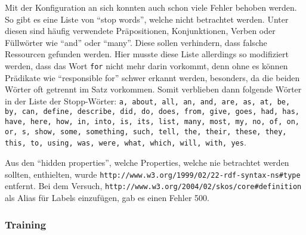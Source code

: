 Mit der Konfiguration an sich konnten auch schon viele Fehler behoben werden.
So gibt es eine Liste von \enquote{stop words}, welche nicht betrachtet werden.
Unter diesen sind häufig verwendete Präpositionen, Konjunktionen, Verben oder Füllwörter wie \enquote{and} oder \enquote{many}.
Diese sollen verhindern, dass falsche Ressourcen gefunden werden.
Hier musste diese Liste allerdings so modifiziert werden, dass das Wort \texttt{for} nicht mehr darin vorkommt, denn ohne es können Prädikate wie \enquote{responsible for} schwer erkannt werden,
besonders, da die beiden Wörter oft getrennt im Satz vorkommen.
Somit verblieben dann folgende Wörter in der Liste der Stopp-Wörter:
\texttt{a, about, all, an, and, are, as, at, be, by, can, define, describe, did, do, does, from, give, goes, had, has, have, here, how, in, into, is, its, list, many, most, my, no, of, on, or, s, show, some, something, such, tell, the, their, these, they, this, to, using, was, were, what, which, will, with, yes}.

Aus den \enquote{hidden properties}, welche Properties, welche nie betrachtet werden sollten, enthielten, wurde \texttt{http://www.w3.org/1999/02/22-rdf-syntax-ns\#type} entfernt.
Bei dem Versuch, \texttt{http://www.w3.org/2004/02/skos/core\#definition} als Alias für Labels einzufügen, gab es einen Fehler 500.

\subsubsection{Training}

